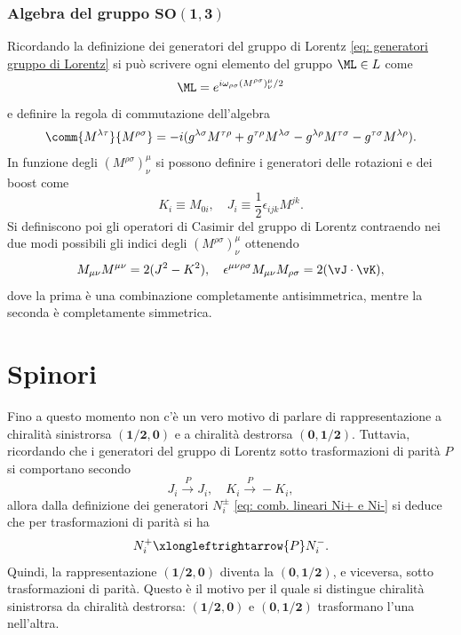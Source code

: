 \subsubsection{Algebra del gruppo \texorpdfstring{$\bm{SO(1,3)}$}{SO(1,3)}}
Ricordando la definizione dei generatori del gruppo di Lorentz \eqref{eq: generatori gruppo di Lorentz} si può scrivere ogni elemento del gruppo $\ML\in L$ come 
\begin{equation}
    \ML = e^{i\omega_{\rho\sigma}(M^{\rho\sigma})^\mu_\nu/2}
\end{equation}
e definire la regola di commutazione dell'algebra 
\begin{equation}
\label{eq: regola di commutazione di so(1,3}
    \comm{M^{\lambda\tau}}{M^{\rho\sigma}} = -i(g^{\lambda\sigma}M^{\tau\rho} + g^{\tau\rho}M^{\lambda\sigma} - g^{\lambda\rho}M^{\tau\sigma} - g^{\tau\sigma}M^{\lambda\rho}).
\end{equation}
In funzione degli $(M^{\rho\sigma})^\mu_\nu$ si possono definire i generatori delle rotazioni e dei boost come 
\begin{equation}
    K_i \equiv M_{0i},\quad J_i\equiv\frac{1}{2}\epsilon_{ijk}M^{jk}.
\end{equation}
Si definiscono poi gli operatori di Casimir del gruppo di Lorentz contraendo nei due modi possibili gli indici degli $(M^{\rho\sigma})^\mu_\nu$ ottenendo
\begin{equation}
\label{eq: relazioni generatori gruppo di Lorentz e J e K}
    M_{\mu\nu}M^{\mu\nu} = 2(J^2 - K^2),\quad \epsilon^{\mu\nu\rho\sigma}M_{\mu\nu}M_{\rho\sigma} = 2(\vJ \cdot \vK),
\end{equation}
dove la prima è una combinazione completamente antisimmetrica, mentre la seconda è completamente simmetrica. 

\section{Spinori}
Fino a questo momento non c'è un vero motivo di parlare di rappresentazione a chiralità sinistrorsa $\bm{(1/2,0)}$ e a chiralità destrorsa $\bm{(0,1/2)}$. Tuttavia, ricordando che i generatori del gruppo di Lorentz sotto trasformazioni di parità $P$ si comportano secondo
\begin{equation}
    J_i \xrightarrow{P} J_i,\quad K_i\xrightarrow{P}-K_i,
\end{equation}
allora dalla definizione dei generatori $N_i^\pm$ \eqref{eq: comb. lineari Ni+ e Ni-} si deduce che per trasformazioni di parità si ha
\begin{equation}
    N_i^+\xlongleftrightarrow{P}N_i^-.
\end{equation}
Quindi, la rappresentazione $\bm{(1/2,0)}$ diventa la $\bm{(0,1/2)}$, e viceversa, sotto trasformazioni di parità. Questo è il motivo per il quale si distingue chiralità sinistrorsa da chiralità destrorsa: $\bm{(1/2,0)}$ e $\bm{(0,1/2)}$ trasformano l'una nell'altra.

